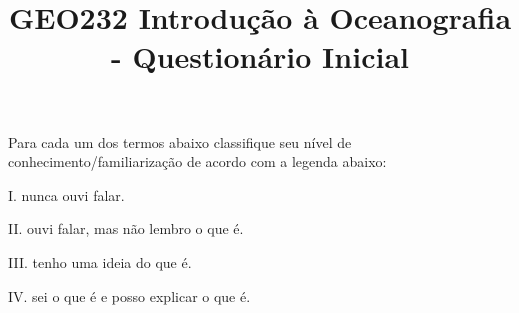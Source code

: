 \documentclass[a4paper,10pt]{article}
\title{GEO232 Introdução à Oceanografia - Questionário Inicial}
\author{\vspace{-10ex}}
\date{\vspace{-10ex}}
\begin{document}
  \maketitle
  \onehalfspace

%

Para cada um dos termos abaixo classifique seu nível de conhecimento/familiarização de acordo com a legenda abaixo:

\begin{multicols}{2}

I. nunca ouvi falar.

II. ouvi falar, mas não lembro o que é.

III. tenho uma ideia do que é.

IV. sei o que é e posso explicar o que é.

\end{multicols}
\end{document}
